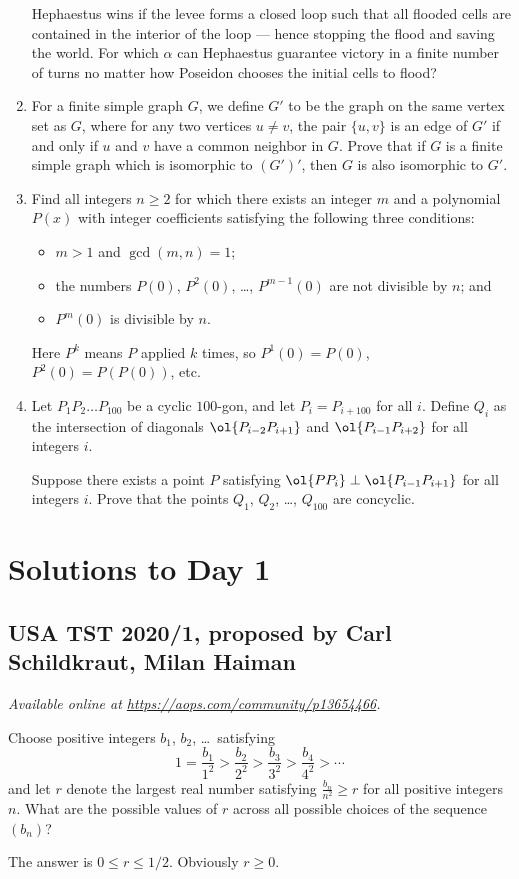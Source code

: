 \documentclass[11pt]{scrartcl}
\begin{document}
\begin{enumerate}[\bfseries 1.]
Hephaestus wins if the levee forms a closed loop
such that all flooded cells are
contained in the interior of the loop ---
hence stopping the flood and saving the world.
For which $\alpha$ can Hephaestus guarantee victory
in a finite number of turns
no matter how Poseidon chooses the initial cells to flood?

\item %
For a finite simple graph $G$, we define $G'$ to be the graph
on the same vertex set as $G$, where for any two vertices $u \neq v$,
the pair $\{u,v\}$ is an edge of $G'$ if and only if
$u$ and $v$ have a common neighbor in $G$.
Prove that if $G$ is a finite simple graph which is isomorphic to $(G')'$,
then $G$ is also isomorphic to $G'$.

\item %
Find all integers $n \ge 2$ for which there exists an integer $m$ and
a polynomial $P(x)$ with integer coefficients satisfying the following three conditions:
\begin{itemize}
  \item $m > 1$ and $\gcd(m,n) = 1$;
  \item the numbers $P(0)$, $P^2(0)$, \dots, $P^{m-1}(0)$ are not divisible by $n$; and
  \item $P^m(0)$ is divisible by $n$.
\end{itemize}
Here $P^k$ means $P$ applied $k$ times, so $P^1(0) = P(0)$, $P^2(0) = P(P(0))$, etc.

\item %
Let $P_1P_2 \dots P_{100}$ be a cyclic $100$-gon,
and let $P_i = P_{i+100}$ for all $i$.
Define $Q_i$ as the intersection of diagonals
$\ol{P_{i-2}P_{i+1}}$ and $\ol{P_{i-1}P_{i+2}}$ for all integers $i$.

Suppose there exists a point $P$
satisfying $\ol{PP_i} \perp \ol{P_{i-1}P_{i+1}}$
for all integers $i$.
Prove that the points $Q_1$, $Q_2$, \dots, $Q_{100}$
are concyclic.

\end{enumerate}
\pagebreak

\section{Solutions to Day 1}
\subsection{USA TST 2020/1, proposed by Carl Schildkraut, Milan Haiman}
\textsl{Available online at \url{https://aops.com/community/p13654466}.}
\begin{mdframed}[style=mdpurplebox,frametitle={Problem statement}]
Choose positive integers $b_1$, $b_2$, \dots\ satisfying
\[ 1 = \frac{b_1}{1^2} > \frac{b_2}{2^2}
  > \frac{b_3}{3^2} > \frac{b_4}{4^2} > \dotsb \]
and let $r$ denote the largest real number
satisfying $\frac{b_n}{n^2} \ge r$ for all positive integers $n$.
What are the possible values of $r$ across all
possible choices of the sequence $(b_n)$?
\end{mdframed}
The answer is $0 \le r \le 1/2$.
Obviously $r \ge 0$.
\end{document}
